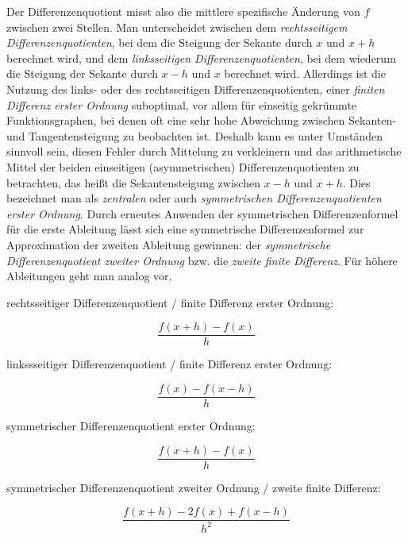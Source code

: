 \documentclass{scrartcl}
\begin{document}
Der Differenzenquotient misst also die mittlere spezifische Änderung von $f$ zwischen zwei Stellen. Man unterscheidet zwischen dem \textit{rechtsseitigem Differenzenquotienten}, bei dem die Steigung der Sekante durch $x$ und $x+h$ berechnet wird, und dem \textit{linksseitigen Differenzenquotienten}, bei dem wiederum die Steigung der Sekante durch $x-h$ und $x$ berechnet wird. Allerdings ist die Nutzung des links- oder des rechtsseitigen Differenzenquotienten, einer \textit{finiten Differenz erster Ordnung} suboptimal, vor allem für einseitig gekrümmte Funktionsgraphen, bei denen oft eine sehr hohe Abweichung zwischen Sekanten- und Tangentensteigung zu beobachten ist. Deshalb kann es unter Umständen sinnvoll sein, diesen Fehler durch Mittelung zu verkleinern und das arithmetische Mittel der beiden einseitigen (asymmetrischen) Differenzenquotienten zu betrachten, das heißt die Sekantensteigung zwischen $x-h$ und $x+h$. Dies bezeichnet man als \textit{zentralen} oder auch \textit{symmetrischen Differenzenquotienten erster Ordnung}. Durch erneutes Anwenden der symmetrischen Differenzenformel für die erste Ableitung lässt sich eine symmetrische Differenzenformel zur Approximation der zweiten Ableitung gewinnen: der \textit{symmetrische Differenzenquotient zweiter Ordnung} bzw. die \textit{zweite finite Differenz}. Für höhere Ableitungen geht man analog vor.
\begin{shaded}
\begin{center}
 rechtsseitiger Differenzenquotient / finite Differenz erster Ordnung:
 \end{center} \[ \frac {f(x+h) - f(x)}{h} \]
\begin{center}
 linkssseitiger Differenzenquotient / finite Differenz erster Ordnung:
 \end{center} \[ \frac {f(x) - f(x-h)}{h} \]
\begin{center}
 symmetrischer Differenzenquotient erster Ordnung:
 \end{center} \[ \frac {f(x+h) - f(x)}{h} \]
\begin{center}
 symmetrischer Differenzenquotient zweiter Ordnung / zweite finite Differenz:
 \end{center} \[ \frac{f(x+h)-2f(x)+f(x-h)}{h^2} \]
\end{shaded}
\end{document}
